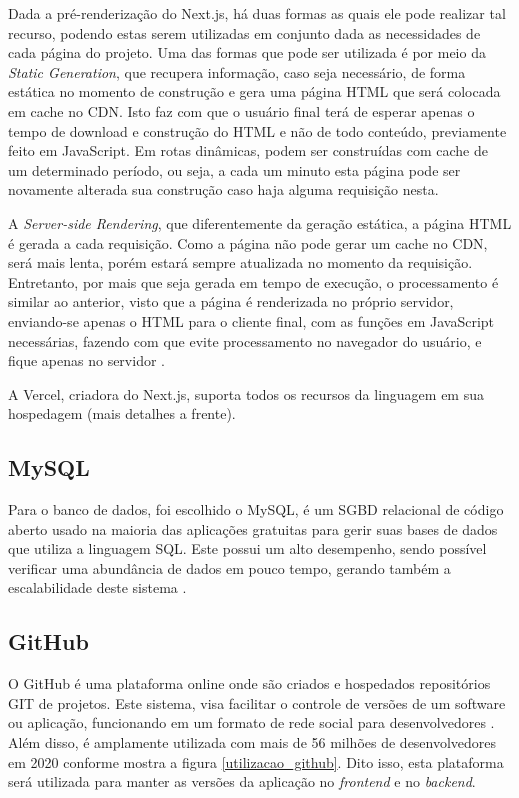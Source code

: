 Dada a pré-renderização do Next.js, há duas formas as quais ele pode realizar tal recurso, podendo estas serem utilizadas em conjunto dada as necessidades de cada página do projeto. Uma das formas que pode ser utilizada é por meio da \textit{Static Generation}, que recupera informação, caso seja necessário, de forma estática no momento de construção e gera uma página HTML que será colocada em cache no CDN. Isto faz com que o usuário final terá de esperar apenas o tempo de download e construção do HTML e não de todo conteúdo, previamente feito em JavaScript. Em rotas dinâmicas, podem ser construídas com cache de um determinado período, ou seja, a cada um minuto esta página pode ser novamente alterada sua construção caso haja alguma requisição nesta.

A \textit{Server-side Rendering}, que diferentemente da geração estática, a página HTML é gerada a cada requisição. Como a página não pode gerar um cache no CDN, será mais lenta, porém estará sempre atualizada no momento da requisição. Entretanto, por mais que seja gerada em tempo de execução, o processamento é similar ao anterior, visto que a página é renderizada no próprio servidor, enviando-se apenas o HTML para o cliente final, com as funções em JavaScript necessárias, fazendo com que evite processamento no navegador do usuário, e fique apenas no servidor \cite{VERCEL}.

A Vercel, criadora do Next.js, suporta todos os recursos da linguagem em sua hospedagem (mais detalhes a frente).

\subsection{MySQL}
Para o banco de dados, foi escolhido o MySQL, é um SGBD relacional de código aberto usado na maioria das aplicações gratuitas para gerir suas bases de dados que utiliza a linguagem SQL. Este possui um alto desempenho, sendo possível verificar uma abundância de dados em pouco tempo, gerando também a escalabilidade deste sistema \cite{HEUSER}.

\subsection{GitHub}
O GitHub é uma plataforma online onde são criados e hospedados repositórios GIT de projetos. Este sistema, visa facilitar o controle de versões de um software ou aplicação, funcionando em um formato de rede social para desenvolvedores \cite{SANTACROCE}. Além disso, é amplamente utilizada com mais de 56 milhões de desenvolvedores em 2020 conforme mostra a figura \ref{utilizacao_github}. Dito isso, esta plataforma será utilizada para manter as versões da aplicação no \textit{frontend} e no \textit{backend}.

